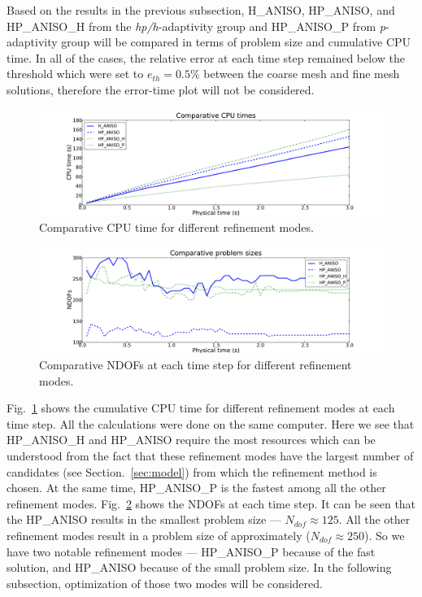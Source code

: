 Based on the results in the previous subsection, H\_ANISO, HP\_ANISO,
and HP\_ANISO\_H from the \emph{hp/h}-adaptivity group and HP\_ANISO\_P
from \emph{p}-adaptivity group will be compared
in terms of problem size and cumulative CPU time. 
In all of the cases, the relative 
error at each time step remained below
the threshold which were set to $e_{th}=0.5\%$ between the coarse mesh
and fine mesh solutions, therefore the error-time plot will not be considered.

\begin{figure}
  \begin{centering}
  \includegraphics[width=\columnwidth]{cpu}
  \caption{\label{fig:cpu} Comparative CPU time for different refinement modes.}
  \end{centering}
\end{figure}

\begin{figure}
  \begin{centering}
  \includegraphics[width=\columnwidth]{dof}
  \caption{\label{fig:dof} Comparative NDOFs at each time step for 
  different refinement modes.}
  \end{centering}
\end{figure}

Fig.~\ref{fig:cpu} shows the cumulative CPU time for different refinement 
modes at each time step. All the calculations were done on the same computer.
Here we see that HP\_ANISO\_H and HP\_ANISO require the most
resources which can be understood from the fact that these 
refinement modes have the largest number of 
candidates (see Section.~\ref{sec:model}) from which the refinement method is chosen.
At the same time, HP\_ANISO\_P is the fastest among all the other refinement modes.
Fig.~\ref{fig:dof} shows the NDOFs at each time step.
It can be seen that the HP\_ANISO results in the 
smallest problem size --- $N_{dof} \approx 125$. 
All the other refinement modes result in a 
problem size of approximately ($N_{dof} \approx 250$). So we have
two notable refinement modes --- HP\_ANISO\_P because of the fast
solution, and HP\_ANISO because of the small problem size. In the following
subsection, optimization of those two modes will be considered.


